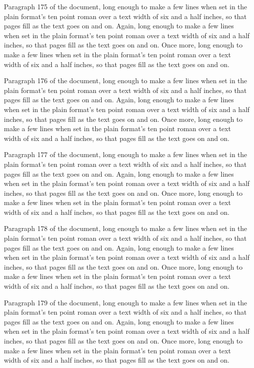 Paragraph 175 of the document, long enough to make a few lines when set in the plain format's ten point roman over a text width of six and a half inches, so that pages fill as the text goes on and on. Again, long enough to make a few lines when set in the plain format's ten point roman over a text width of six and a half inches, so that pages fill as the text goes on and on. Once more, long enough to make a few lines when set in the plain format's ten point roman over a text width of six and a half inches, so that pages fill as the text goes on and on.

Paragraph 176 of the document, long enough to make a few lines when set in the plain format's ten point roman over a text width of six and a half inches, so that pages fill as the text goes on and on. Again, long enough to make a few lines when set in the plain format's ten point roman over a text width of six and a half inches, so that pages fill as the text goes on and on. Once more, long enough to make a few lines when set in the plain format's ten point roman over a text width of six and a half inches, so that pages fill as the text goes on and on.

Paragraph 177 of the document, long enough to make a few lines when set in the plain format's ten point roman over a text width of six and a half inches, so that pages fill as the text goes on and on. Again, long enough to make a few lines when set in the plain format's ten point roman over a text width of six and a half inches, so that pages fill as the text goes on and on. Once more, long enough to make a few lines when set in the plain format's ten point roman over a text width of six and a half inches, so that pages fill as the text goes on and on.

Paragraph 178 of the document, long enough to make a few lines when set in the plain format's ten point roman over a text width of six and a half inches, so that pages fill as the text goes on and on. Again, long enough to make a few lines when set in the plain format's ten point roman over a text width of six and a half inches, so that pages fill as the text goes on and on. Once more, long enough to make a few lines when set in the plain format's ten point roman over a text width of six and a half inches, so that pages fill as the text goes on and on.

Paragraph 179 of the document, long enough to make a few lines when set in the plain format's ten point roman over a text width of six and a half inches, so that pages fill as the text goes on and on. Again, long enough to make a few lines when set in the plain format's ten point roman over a text width of six and a half inches, so that pages fill as the text goes on and on. Once more, long enough to make a few lines when set in the plain format's ten point roman over a text width of six and a half inches, so that pages fill as the text goes on and on.

